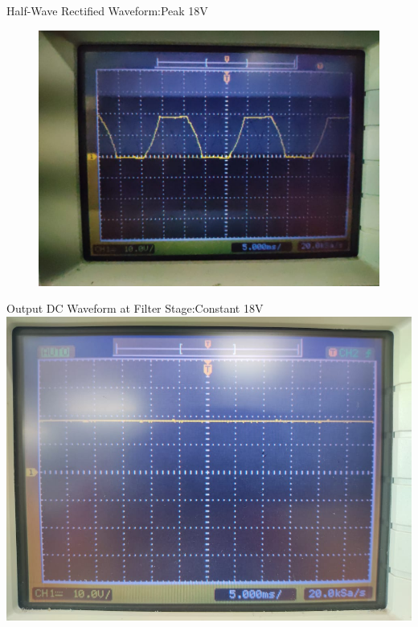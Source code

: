 \documentclass{beamer}
\begin{document}
\begin{frame}{Half-Wave Rectified Waveform:Peak 18V}
	\begin{figure}[!ht]
		\includegraphics[width=\columnwidth]{figs/rectifiedwave.jpeg}
	\end{figure}
\end{frame}
\begin{frame}{Output DC Waveform at Filter Stage:Constant 18V}
	\includegraphics[width=\columnwidth]{figs/3.jpeg}
\end{frame}
\end{document}
